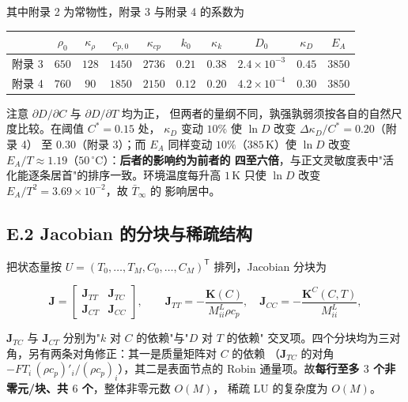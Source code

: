 \documentclass[withoutpreface,bwprint]{cumcmthesis} %
\begin{document}
\begin{appendices}
\noindent 其中附录 2 为常物性，附录 3 与附录 4 的系数为

\begin{table}[htbp]
\centering
\begin{minipage}{0.94\textwidth}
\centering\small
\begin{tabular}{lccccccccc}
\toprule
 & $\rho_0$ & $\kappa_\rho$ & $c_{p,0}$ & $\kappa_{cp}$ & $k_0$ & $\kappa_k$
 & $D_0$ & $\kappa_D$ & $E_A$ \\
\midrule
附录 3 & $650$ & $128$ & $1450$ & $2736$ & $0.21$ & $0.38$
 & $2.4\times10^{-3}$ & $0.45$ & $3850$ \\
附录 4 & $760$ & $90$ & $1850$ & $2150$ & $0.12$ & $0.20$
 & $4.2\times10^{-4}$ & $0.30$ & $3850$ \\
\bottomrule
\end{tabular}
\end{minipage}
\end{table}

\noindent 注意 $\partial D/\partial C$ 与 $\partial D/\partial T$ 均为正，
但两者的量纲不同，孰强孰弱须按各自的自然尺度比较。在阈值 $C^*=0.15$ 处，
$\kappa_D$ 变动 $10\%$ 使 $\ln D$ 改变 $\Delta\kappa_D/C^*=0.20$（附录 4）
至 $0.30$（附录 3）；而 $E_A$ 同样变动 $10\%$（$385\,\mathrm{K}$）使
$\ln D$ 改变 $E_A/T\approx1.19$（$50\,^\circ\mathrm{C}$）：\textbf{后者的影响约为前者的
四至六倍}，与正文灵敏度表中"活化能逐条居首"的排序一致。环境温度每升高
$1\,\mathrm{K}$ 只使 $\ln D$ 改变 $E_A/T^2=3.69\times10^{-2}$，故 $\bar T_\infty$ 的
影响居中。

\subsection*{E.2 Jacobian 的分块与稀疏结构}

把状态量按 $U=(T_0,\dots,T_M,C_0,\dots,C_M)^{\mathsf T}$ 排列，Jacobian 分块为

\begin{equation}
\mathbf J=\begin{bmatrix}\mathbf J_{TT} & \mathbf J_{TC}\\
\mathbf J_{CT} & \mathbf J_{CC}\end{bmatrix},
\qquad
\mathbf J_{TT}=-\frac{\mathbf K(C)}{M^L_{ii}\rho c_p},\quad
\mathbf J_{CC}=-\frac{\mathbf K^C(C,T)}{M^L_{ii}},
\end{equation}

$\mathbf J_{TC}$ 与 $\mathbf J_{CT}$ 分别为"$k$ 对 $C$ 的依赖"与"$D$ 对 $T$ 的依赖"
交叉项。四个分块均为三对角，另有两条对角修正：其一是质量矩阵对 $C$ 的依赖
（$\mathbf J_{TC}$ 的对角 $-FT_i\,(\rho c_p)'_i/(\rho c_p)_i$），其二是表面节点的
Robin 通量项。故\textbf{每行至多 $3$ 个非零元/块、共 $6$ 个}，整体非零元数 $O(M)$，
稀疏 LU 的复杂度为 $O(M)$。


\end{appendices}
\end{document}

